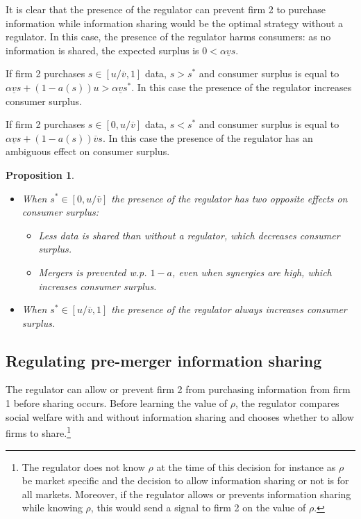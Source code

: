 \documentclass[a4paper,leqno]{article}%
\newtheorem{prop}{Proposition}
\renewcommand{\a}{\alpha}
\newcommand{\uv}{\underline{v}}
\newcommand{\ov}{\overline{v}}
\begin{document}
It is clear that the presence of the regulator can prevent firm 2 to purchase information while information sharing would be the optimal strategy without a regulator. In this case, the presence of the regulator harms consumers: as no information is shared, the expected surplus is $0<\a \uv s$.

\medskip

If firm 2 purchases $s\in[u/\ov,1]$ data, $s>s^*$ and consumer surplus is equal to $\a \uv s+(1-a(s))u>\a \uv s^*$. In this case the presence of the regulator increases consumer surplus. 

\medskip

If firm 2 purchases $s\in[0,u/\ov]$ data, $s<s^*$ and consumer surplus is equal to $\a \uv s+(1-a(s))\ov s$. In this case the presence of the regulator has an ambiguous effect on consumer surplus. 


\medskip

\begin{prop}~~

\begin{itemize}
    \item When $s^*\in[0,u/\ov]$ the presence of the regulator has two opposite effects on consumer surplus:
    \begin{itemize}
        \item Less data is shared than without a regulator, which decreases consumer surplus.
        \item Mergers is prevented w.p. $1-a$, even when synergies are high, which increases consumer surplus.
    \end{itemize}
    \item When $s^*\in[u/\ov,1]$ the presence of the regulator always increases consumer surplus.
\end{itemize}

\end{prop}

\medskip

\subsection{Regulating pre-merger information sharing}

The regulator can allow or prevent firm 2 from purchasing information from firm 1 before sharing occurs. Before learning the value of $\rho$, the regulator compares social welfare with and without information sharing and chooses whether to allow firms to share.\footnote{The regulator does not know $\rho$ at the time of this decision for instance as $\rho$ be market specific and the decision to allow information sharing or not is for all markets. Moreover, if the regulator allows or prevents information sharing while knowing $\rho$, this would send a signal to firm 2 on the value of $\rho$.}
\end{document}
